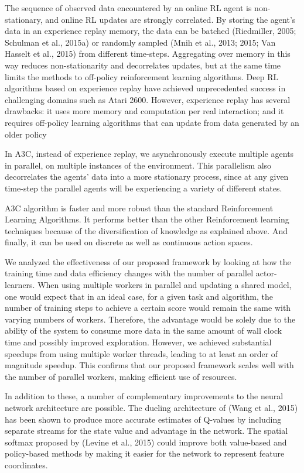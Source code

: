 \documentclass[conference]{IEEEtran}
\begin{document}
The sequence of observed data encountered by an online RL agent is non-stationary, and online RL updates are strongly correlated. By storing the agent’s data in an experience replay memory, the data can be batched (Riedmiller, 2005; Schulman et al., 2015a) or randomly sampled (Mnih et al., 2013; 2015; Van Hasselt et al., 2015) from different time-steps. Aggregating over memory in this way reduces non-stationarity and decorrelates updates, but at the same time limits the methods to off-policy reinforcement learning algorithms. Deep RL algorithms based on experience replay have achieved unprecedented success in challenging domains such as Atari 2600. However, experience replay has several drawbacks: it uses more memory and computation per real interaction; and it requires off-policy learning algorithms that can update from data generated by an older policy

In A3C, instead of experience replay, we asynchronously execute multiple agents in parallel, on multiple instances of the environment. This parallelism also decorrelates the agents’ data into a more stationary process, since at any given time-step the parallel agents will be experiencing a variety of different states.

A3C algorithm is faster and more robust than the standard Reinforcement Learning Algorithms. It performs better than the other Reinforcement learning techniques because of the diversification of knowledge as explained above. And finally, it can be used on discrete as well as continuous action spaces.

We analyzed the effectiveness of our proposed framework by looking at how the training time and data efficiency changes with the number of parallel actor-learners. When using multiple workers in parallel and updating a shared model, one would expect that in an ideal case, for a given task and algorithm, the number of training steps to achieve a certain score would remain the same with varying numbers of workers. Therefore, the advantage would be solely due to the ability of the system to consume more data in the same amount of wall clock time and possibly improved exploration. However, we achieved substantial speedups from using multiple worker threads, leading to at least an order of magnitude speedup. This confirms that our proposed framework scales well with the number of parallel workers, making efficient use of resources.

In addition to these, a number of complementary improvements to the neural network architecture are possible. The dueling architecture of (Wang et al., 2015) has been shown to produce more accurate estimates of Q-values by including separate streams for the state value and advantage in the network. The spatial softmax proposed by (Levine et al., 2015) could improve both value-based and policy-based methods by making it easier for the network to represent feature coordinates.
\end{document}
